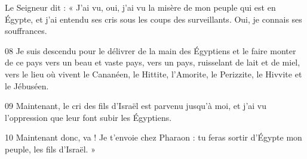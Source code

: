 Le Seigneur dit : « J’ai vu, oui, j’ai vu la misère de mon peuple qui est en Égypte, et j’ai entendu ses cris sous les coups des surveillants. Oui, je connais ses souffrances.

08 Je suis descendu pour le délivrer de la main des Égyptiens et le faire monter de ce pays vers un beau et vaste pays, vers un pays, ruisselant de lait et de miel, vers le lieu où vivent le Cananéen, le Hittite, l’Amorite, le Perizzite, le Hivvite et le Jébuséen.

09 Maintenant, le cri des fils d’Israël est parvenu jusqu’à moi, et j’ai vu l’oppression que leur font subir les Égyptiens.

10 Maintenant donc, va ! Je t’envoie chez Pharaon : tu feras sortir d’Égypte mon peuple, les fils d’Israël. »